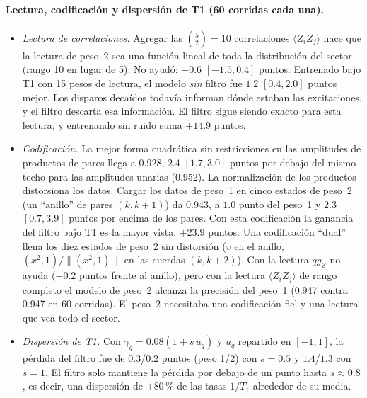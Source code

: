 \documentclass[11pt]{article}
\newcommand{\qZ}{qg_Z}
\begin{document}
\paragraph{Lectura, codificación y dispersión de T1 (60 corridas cada una).}\label{sec:more}
\begin{itemize}
\item \textit{Lectura de correlaciones.} Agregar las $\binom52=10$ correlaciones $\langle Z_iZ_j\rangle$ hace que
  la lectura de peso~2 sea una función lineal de toda la distribución del sector (rango 10 en lugar de 5). No
  ayudó: $-0.6$ $[-1.5,0.4]$ puntos. Entrenado bajo T1 con 15 pesos de lectura, el modelo \emph{sin} filtro fue
  $1.2$ $[0.4,2.0]$ puntos mejor. Los disparos decaídos todavía informan dónde estaban las excitaciones, y el
  filtro descarta esa información. El filtro sigue siendo exacto para esta lectura, y entrenando sin ruido
  suma $+14.9$ puntos.
\item \textit{Codificación.} La mejor forma cuadrática sin restricciones en las amplitudes de productos de
  pares llega a 0.928, $2.4$ $[1.7,3.0]$ puntos por debajo del mismo techo para las amplitudes unarias
  (0.952). La normalización de los productos distorsiona los datos. Cargar los datos de peso~1 en cinco
  estados de peso~2 (un ``anillo'' de pares $(k,k+1)$) da 0.943, a $1.0$ punto del peso~1 y $2.3$ $[0.7,3.9]$
  puntos por encima de los pares. Con esta codificación la ganancia del filtro bajo T1 es la mayor vista,
  $+23.9$ puntos. Una codificación ``dual'' llena los diez estados de peso~2 sin distorsión ($v$ en el anillo,
  $(x^2,1)/\|(x^2,1)\|$ en las cuerdas $(k,k+2)$). Con la lectura $\qZ$ no ayuda ($-0.2$ puntos frente al anillo),
  pero con la lectura $\langle Z_iZ_j\rangle$ de rango completo el modelo de peso~2 alcanza la precisión del
  peso~1 (0.947 contra 0.947 en 60 corridas). El peso~2 necesitaba una codificación fiel y una lectura que vea
  todo el sector.
\item \textit{Dispersión de T1.} Con $\gamma_q=0.08(1+s\,u_q)$ y $u_q$ repartido en $[-1,1]$, la pérdida del
  filtro fue de $0.3$/$0.2$ puntos (peso 1/2) con $s=0.5$ y $1.4$/$1.3$ con $s=1$. El filtro solo mantiene la
  pérdida por debajo de un punto hasta $s\approx0.8$, es decir, una dispersión de $\pm80\,\%$ de las tasas
  $1/T_1$ alrededor de su media.
\end{itemize}
\end{document}
